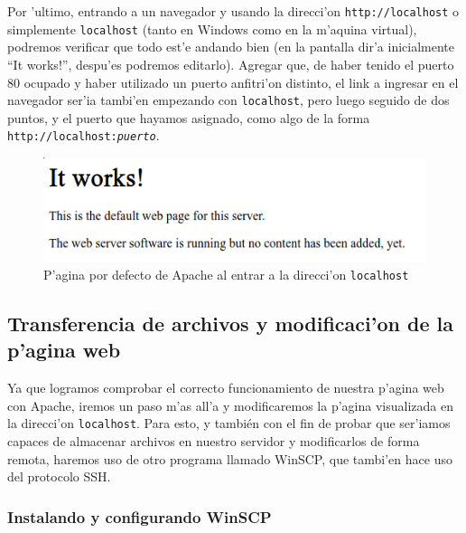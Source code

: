 \documentclass[11pt]{article}
\begin{document}
		Por 'ultimo, entrando a un navegador y usando la direcci'on \verb|http://localhost| o simplemente \verb|localhost| (tanto en Windows como en la m'aquina virtual), podremos verificar que todo est'e andando bien (en la pantalla dir'a inicialmente  ``It works!'', despu'es podremos editarlo). Agregar que, de haber tenido el puerto 80 ocupado y haber utilizado un puerto anfitri'on distinto, el link a ingresar en el navegador ser'ia tambi'en empezando con \verb|localhost|, pero luego seguido de dos puntos, y el puerto que hayamos asignado, como algo de la forma \texttt{http://localhost:\emph{puerto}}.
		
	\begin{figure}[H]
		\centering
		\includegraphics[width=.8\linewidth]{Images/Apache/fig7.png}
		\caption{P'agina por defecto de Apache al entrar a la direcci'on \texttt{localhost}}
		\label{fig:index_orig_code}
	\end{figure}
		
	\subsection{Transferencia de archivos y modificaci'on de la p'agina web}
	
	Ya que logramos comprobar el correcto funcionamiento de nuestra p'agina web con Apache, iremos un paso m'as all'a y modificaremos la p'agina visualizada en la direcci'on \texttt{localhost}. Para esto, y también con el fin de probar que ser'iamos capaces de almacenar archivos en nuestro servidor y modificarlos de forma remota, haremos uso de otro programa llamado WinSCP, que tambi'en hace uso del protocolo SSH.
	
	\subsubsection{Instalando y configurando WinSCP}
	
\end{document}
